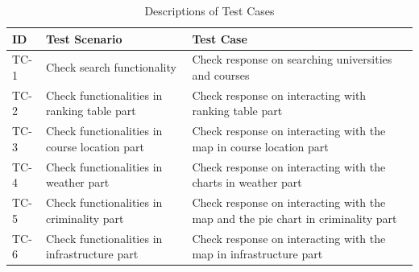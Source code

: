 \begin{table}[H]
\centering
\caption{Descriptions of Test Cases}
\label{my-label}
\begin{tabular}{|l|p{4cm}|p{8cm}|}
\hline
\textbf{ID} & \textbf{Test Scenario}                        & \textbf{Test Case}                                                               \\ \hline
TC-1        & Check search functionality                    & Check response on searching universities and courses                             \\ \hline
TC-2        & Check functionalities in ranking table part   & Check response on interacting with ranking table part                            \\ \hline
TC-3        & Check functionalities in course location part & Check response on interacting with the map in course location part               \\ \hline
TC-4        & Check functionalities in weather part         & Check response on interacting with the charts in weather part                    \\ \hline
TC-5        & Check functionalities in criminality part     & Check response on interacting with the map and the pie chart in criminality part \\ \hline
TC-6        & Check functionalities in infrastructure part  & Check response on interacting with the map in infrastructure part                \\ \hline
\end{tabular}
\end{table}



